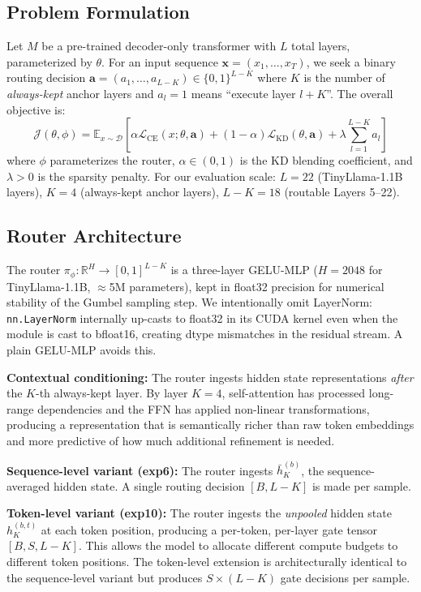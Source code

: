 \documentclass[conference]{IEEEtran}
\begin{document}
\subsection{Problem Formulation}
Let $M$ be a pre-trained decoder-only transformer with $L$ total layers, parameterized by $\theta$. For an input sequence $\mathbf{x} = (x_1, \dots, x_T)$, we seek a binary routing decision $\mathbf{a} = (a_1, \dots, a_{L-K}) \in \{0,1\}^{L-K}$ where $K$ is the number of \textit{always-kept} anchor layers and $a_l = 1$ means ``execute layer $l+K$''. The overall objective is:
\begin{equation}
\mathcal{J}(\theta, \phi) = \mathbb{E}_{x \sim \mathcal{D}} \left[ \alpha \mathcal{L}_{\text{CE}}(x; \theta, \mathbf{a}) + (1-\alpha)\mathcal{L}_{\text{KD}}(\theta, \mathbf{a}) + \lambda \sum_{l=1}^{L-K} a_l \right]
\end{equation}
where $\phi$ parameterizes the router, $\alpha \in (0,1)$ is the KD blending coefficient, and $\lambda > 0$ is the sparsity penalty. 
For our evaluation scale: $L = 22$ (TinyLlama-1.1B layers), $K = 4$ (always-kept anchor layers), $L-K = 18$ (routable Layers 5--22).

\subsection{Router Architecture}
The router $\pi_\phi: \mathbb{R}^H \to [0,1]^{L-K}$ is a three-layer GELU-MLP ($H=2048$ for TinyLlama-1.1B, $\approx$5M parameters), kept in float32 precision for numerical stability of the Gumbel sampling step. We intentionally omit LayerNorm: \texttt{nn.LayerNorm} internally up-casts to float32 in its CUDA kernel even when the module is cast to bfloat16, creating dtype mismatches in the residual stream. A plain GELU-MLP avoids this.

\textbf{Contextual conditioning:} The router ingests hidden state representations \textit{after} the $K$-th always-kept layer. By layer $K=4$, self-attention has processed long-range dependencies and the FFN has applied non-linear transformations, producing a representation that is semantically richer than raw token embeddings and more predictive of how much additional refinement is needed.

\textbf{Sequence-level variant (exp6):} The router ingests $\bar{h}_K^{(b)}$, the sequence-averaged hidden state. A single routing decision $[B, L-K]$ is made per sample.

\textbf{Token-level variant (exp10):} The router ingests the \textit{unpooled} hidden state $h_K^{(b,t)}$ at each token position, producing a per-token, per-layer gate tensor $[B, S, L-K]$. This allows the model to allocate different compute budgets to different token positions. The token-level extension is architecturally identical to the sequence-level variant but produces $S \times (L-K)$ gate decisions per sample.
\end{document}
